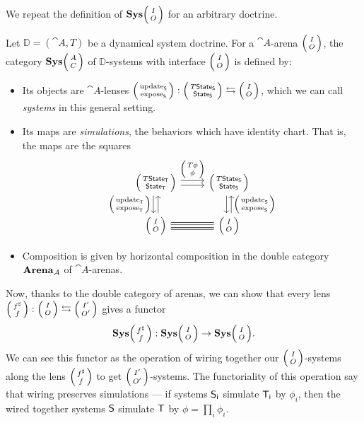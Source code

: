 \documentclass[DynamicalBook]{subfiles}
\begin{document}
We repeat the definition of $\Cat{Sys}\lens{I}{O}$ for an arbitrary doctrine.
  \begin{definition}
  Let $\mathbb{D} = (\cat{A}, T)$ be a dynamical system doctrine. For a
    $\cat{A}$-arena $\lens{I}{O}$, the category $\Cat{Sys}\lens{A}{C}$ of
    $\mathbb{D}$-systems with interface $\lens{I}{O}$ is defined by:
\begin{itemize}
  \item Its objects are $\cat{A}$-lenses $\lens{\update{S}}{\expose{S}} :
    \lens{T\State{S}}{\State{S}} \fromto \lens{I}{O}$, which we can call
    \emph{systems} in this general setting.
  \item Its maps are \emph{simulations}, the behaviors which have identity
    chart. That is, the maps are the squares 
\[
    \begin{tikzcd}
      \lens{T\State{T}}{\State{T}} \ar[r, shift left, "\lens{T\phi}{\phi}"] \ar[r, shift right] \ar[d, shift right,
      "\lens{\update{T}}{\expose{T}}"'] \ar[d, shift left, leftarrow] &
      \lens{T\State{S}}{\State{S}} \ar[d, shift left, leftarrow,
      "\lens{\update{S}}{\expose{S}}"] \ar[d, shift right]\\
      \lens{I}{O} \ar[r, shift right, equals] \ar[r,
      shift left, equals] & \lens{I}{O}
    \end{tikzcd}
\]
\item Composition is given by horizontal composition in the double category
  $\textbf{Arena}_{\mathcal{A}}$ of $\cat{A}$-arenas.
\end{itemize}
  \end{definition}

Now, thanks to the double category of arenas, we can show that every lens
$\lens{f^{\sharp}}{f} : \lens{I}{O} \fromto \lens{I'}{O'}$ gives a functor 
  $$\Cat{Sys}\lens{f^\sharp}{f} : \Cat{Sys}\lens{I}{O} \to
  \Cat{Sys}\lens{I}{O}.$$
We can see this functor as the operation of wiring together our
$\lens{I}{O}$-systems along the lens $\lens{f^{\sharp}}{f}$ to get
$\lens{I'}{O'}$-systems. The functoriality of this operation say that wiring
preserves simulations --- if systems $\mathsf{S_i}$ simulate $\mathsf{T_i}$ by $\phi_i$,
then the wired together systems $\mathsf{S}$ simulate $\mathsf{T}$ by $\phi = \prod_i
\phi_i$. 
\end{document}
